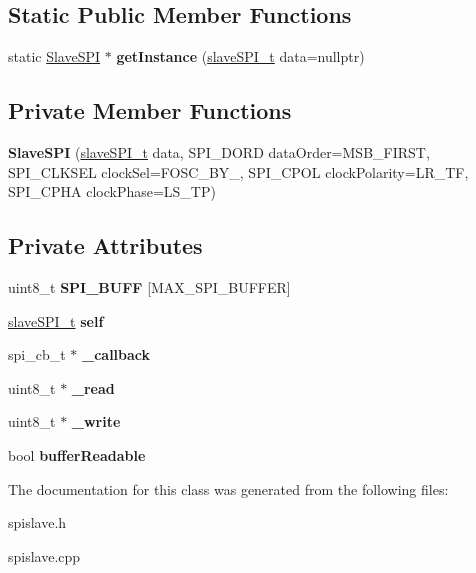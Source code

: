 \subsection*{Static Public Member Functions}
\begin{DoxyCompactItemize}
\item 
\mbox{\label{classSlaveSPI_af853e49df2daa8df562c211d4c01c825}} 
static \hyperlink{classSlaveSPI}{Slave\+S\+PI} $\ast$ {\bfseries get\+Instance} (\hyperlink{structslaveSPI__t}{slave\+S\+P\+I\+\_\+t} data=nullptr)
\end{DoxyCompactItemize}
\subsection*{Private Member Functions}
\begin{DoxyCompactItemize}
\item 
\mbox{\label{classSlaveSPI_a4e4d482325a3cdd0f626130ba351c402}} 
{\bfseries Slave\+S\+PI} (\hyperlink{structslaveSPI__t}{slave\+S\+P\+I\+\_\+t} data, S\+P\+I\+\_\+\+D\+O\+RD data\+Order=M\+S\+B\+\_\+\+F\+I\+R\+ST, S\+P\+I\+\_\+\+C\+L\+K\+S\+EL clock\+Sel=F\+O\+S\+C\+\_\+\+B\+Y\+\_, S\+P\+I\+\_\+\+C\+P\+OL clock\+Polarity=L\+R\+\_\+\+TF, S\+P\+I\+\_\+\+C\+P\+HA clock\+Phase=L\+S\+\_\+\+TP)
\end{DoxyCompactItemize}
\subsection*{Private Attributes}
\begin{DoxyCompactItemize}
\item 
\mbox{\label{classSlaveSPI_a6a33cdba141195a5a8157aed8dd39527}} 
uint8\+\_\+t {\bfseries S\+P\+I\+\_\+\+B\+U\+FF} \mbox{[}M\+A\+X\+\_\+\+S\+P\+I\+\_\+\+B\+U\+F\+F\+ER\mbox{]}
\item 
\mbox{\label{classSlaveSPI_a4c6a1758bdfcc6b7987aa8aaade47e57}} 
\hyperlink{structslaveSPI__t}{slave\+S\+P\+I\+\_\+t} {\bfseries self}
\item 
\mbox{\label{classSlaveSPI_adaf64cc08db2c73c7304d1ab9e6ef7c4}} 
spi\+\_\+cb\+\_\+t $\ast$ {\bfseries \+\_\+callback}
\item 
\mbox{\label{classSlaveSPI_ad9cf150323ece7a6f842d678b2aa1b79}} 
uint8\+\_\+t $\ast$ {\bfseries \+\_\+read}
\item 
\mbox{\label{classSlaveSPI_a7ce2f27aafe7c97bf92426aa79d7c4cf}} 
uint8\+\_\+t $\ast$ {\bfseries \+\_\+write}
\item 
\mbox{\label{classSlaveSPI_ab4d9e7eebaaead1f8dde9f933bfec2f1}} 
bool {\bfseries buffer\+Readable}
\end{DoxyCompactItemize}


The documentation for this class was generated from the following files\+:\begin{DoxyCompactItemize}
\item 
spislave.\+h\item 
spislave.\+cpp\end{DoxyCompactItemize}
